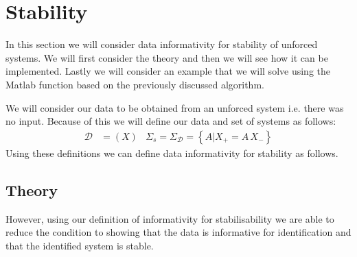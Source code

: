 \section{Stability}
In this section we will consider data informativity for stability of unforced systems. We will first consider the theory and then we will see how it can be implemented. Lastly we will consider an example that we will solve using the Matlab function based on the previously discussed algorithm.

We will consider our data to be obtained from an unforced system i.e. there was no input. Because of this we will define our data and set of systems as follows:
\begin{align*}
\mathcal{D} &= (X) & \Sigma_s = \Sigma_\mathcal{D} = \left\{ A | X_+ = A \, X_- \right\}
\end{align*}
Using these definitions we can define data informativity for stability as follows.



\subsection{Theory}
However, using our definition of informativity for stabilisability we are able to reduce the condition to showing that the data is informative for identification and that the identified system is stable.



